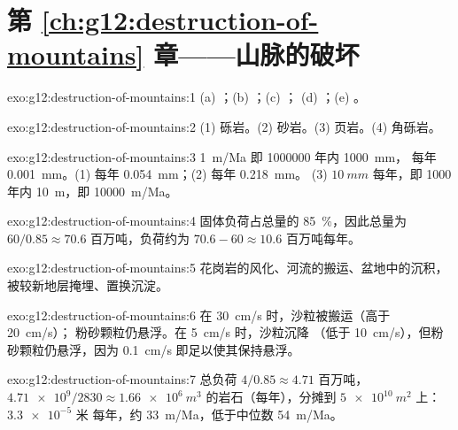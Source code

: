 \section*{第 \ref{ch:g12:destruction-of-mountains} 章——山脉的破坏}

\begin{solution}{exo:g12:destruction-of-mountains:1}
(a) ；(b) ；(c) ；
(d) ；(e) 。
\end{solution}

\begin{solution}{exo:g12:destruction-of-mountains:2}
(1) 砾岩。(2) 砂岩。(3) 页岩。(4) 角砾岩。
\end{solution}

\begin{solution}{exo:g12:destruction-of-mountains:3}
\qty{1}{m/Ma} 即 \num{1000000} 年内 \qty{1000}{mm}，
每年 \qty{0.001}{mm}。(1) 每年 \qty{0.054}{mm}；(2) 每年 \qty{0.218}{mm}。
(3) $\qty{10}{mm}$ 每年，即 1000 年内 \qty{10}{m}，即 \qty{10000}{m/Ma}。
\end{solution}

\begin{solution}{exo:g12:destruction-of-mountains:4}
固体负荷占总量的 \qty{85}{\percent}，因此总量为 $60/0.85
\approx 70.6$ 百万吨，负荷约为 $70.6 - 60 \approx
10.6$ 百万吨每年。
\end{solution}

\begin{solution}{exo:g12:destruction-of-mountains:5}
花岗岩的风化、河流的搬运、盆地中的沉积，
被较新地层掩埋、置换沉淀。
\end{solution}

\begin{solution}{exo:g12:destruction-of-mountains:6}
在 \qty{30}{cm/s} 时，沙粒被搬运（高于 \qty{20}{cm/s}）；
粉砂颗粒仍悬浮。在 \qty{5}{cm/s} 时，沙粒沉降
（低于 \qty{10}{cm/s}），但粉砂颗粒仍悬浮，因为
\qty{0.1}{cm/s} 即足以使其保持悬浮。
\end{solution}

\begin{solution}{exo:g12:destruction-of-mountains:7}
总负荷 $4/0.85 \approx 4.71$ 百万吨，$\num{4.71e9}/2830 \approx
\qty{1.66e6}{m^3}$ 的岩石（每年），分摊到 $\qty{5e10}{m^2}$ 上：$\num{3.3e-5}$ 米
每年，约 \qty{33}{m/Ma}，低于中位数 \qty{54}{m/Ma}。
\end{solution}

